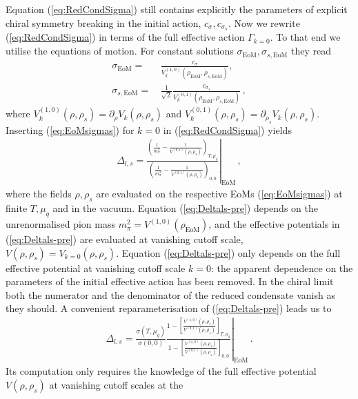 \documentclass[%
reprint,
superscriptaddress,
showpacs,preprintnumbers,
 amsmath,amssymb,
 aps,
prd,
]{revtex4-1}
\def\Eq#1{Equation (\ref{#1})}
\def\eq#1{(\ref{#1})}
\begin{document}
\Eq{eq:RedCondSigma} still contains explicitly the parameters of
explicit chiral symmetry breaking in the initial action,
$c_\sigma, c_{\sigma_s}$. Now we rewrite \eq{eq:RedCondSigma} in terms
of the full effective action $\Gamma_{k=0}$. To that end we utilise
the equations of motion. For constant solutions
$\sigma_\textrm{EoM}, \sigma_{s,\textrm{EoM}}$ they read
%
\begin{align}\nonumber 
  \sigma_\textrm{EoM}=
  &\,
    \frac{c_\sigma}{V^{(1,0)}_k(\rho_\textrm{EoM},
    \rho_{s,\textrm{EoM}})}, \\[1ex] 
  \sigma_{s,\textrm{EoM}}=
  &\,\frac{1}{\sqrt{2}} \frac{c_{\sigma_s}}{
    V^{(0,1)}_k(\rho_\textrm{EoM},\rho_{s,\textrm{EoM}})}  \,, 
\label{eq:EoMsigmas}\end{align}
%
where $V^{(1,0)}_k(\rho,\rho_{s}) =\partial_\rho V_k(\rho,\rho_{s})$
and
$V^{(0,1)}_k(\rho,\rho_{s}) =\partial_{\rho_s} V_k(\rho,\rho_{s})$.
Inserting \eq{eq:EoMsigmas} for $k=0$ in \eq{eq:RedCondSigma} yields
%
\begin{align}\label{eq:Deltals-pre}
  \Delta_{l,s} = \left.\frac{\left(\frac{1}{m_\pi^2} -
  \frac{1}{ V^{(0,1)}(\rho,\rho_{s})}\right)_{T,\mu_q}}
  {\left(\frac{1}{m_\pi^2} -
  \frac{1}{ V^{(0,1)}(\rho,\rho_{s})}
  \right)_{0,0}}\right|_{\textrm{EoM}}\,,
\end{align}
%
where the fields $\rho,\rho_s$ are evaluated on the respective EoMs
\eq{eq:EoMsigmas} at finite $T,\mu_q$ and in the
vacuum. \Eq{eq:Deltals-pre} depends on the unrenormalised pion mass
$m_\pi^2=V^{(1,0)}(\rho_\textrm{EoM})$, and the effective potentials
in \eq{eq:Deltals-pre} are evaluated at vanishing cutoff scale,
$V(\rho,\rho_s)=V_{k=0}(\rho,\rho_s)$. \Eq{eq:Deltals-pre} only
depends on the full effective potential at vanishing cutoff scale
$k=0$: the apparent dependence on the parameters of the initial
effective action has been removed. In the chiral limit both the
numerator and the denominator of the reduced condensate vanish as they
should. A convenient reparameterisation of \eq{eq:Deltals-pre} leads
us to
%
\begin{align}\label{eq:Deltals-final}
  \Delta_{l,s} =\left. \frac{ \sigma(T,\mu_q)}{ \sigma(0,0)} \frac{  1
  -  \left[\frac{ V^{(1,0)}(\rho,\rho_{s}) }{
  V^{(0,1)}(\rho,\rho_{s}) }\right]_{T,\mu_q}}
  {1 - \left[  \frac{ V^{(1,0)}(\rho,\rho_{s}) }{
  V^{(0,1)}(\rho,\rho_{s}) }\right]_{0,0}}\right|_{\textrm{EoM}}\,. 
\end{align}
%
Its computation only requires the knowledge of the full effective
potential $V(\rho,\rho_s)$ at vanishing cutoff scales at the
\end{document}
